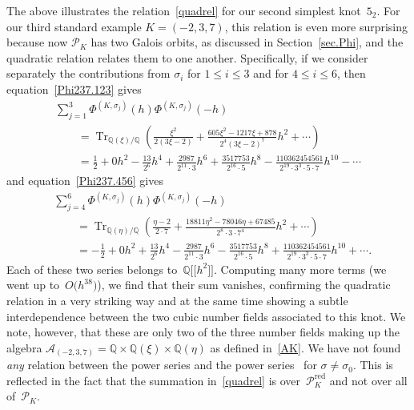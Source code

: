 \documentclass[pdftex]{sigma}
\numberwithin{equation}{section}
\def\BQ{\mathbb Q}
\def\calA{\mathcal A}
\def\calP{\mathcal P}
\def\calP{\mathcal P}
\def\a{\alpha}
\def\Q{\mathbb Q}
\def\m{ - }
\def\a{\alpha}
\def\s{\sigma}
\def\RED{^{\text{red}}}
\def\calPx{\mathcal{P}\RED} %
\begin{document}
The above illustrates the relation~\eqref{quadrel} for our second simplest knot~$5_2$.
For our third standard example $K=(-2,3,7)$, this relation is even more surprising
because now $\calP_K$ has two Galois orbits, as discussed in Section~\ref{sec.Phi},
and the quadratic relation relates them to one another. Specifically, if we
consider separately the contributions from $\s_i$ for $1\le i\le 3$ and
for $4\le i\le6$, then equation~\eqref{Phi237.123} gives
\begin{gather*}
 \sum_{j=1}^3 \Phi^{(K,\s_j)}(h) \Phi^{(K,\s_j)}(-h)\\
\qquad= \operatorname{Tr}_{\Q(\xi)/\Q}\left(\frac{\xi^2}{2 (3\xi-2)}
+ \frac{605\xi^2 - 1217 \xi +878}{2^4 (3\xi-2)^7} h^2 + \cdots\right) \\
 \qquad =\frac12+ 0 h^2 \m \frac{13}{2^6} h^4
+ \frac{2987}{2^{11}\cdot3} h^6 + \frac{3517753}{2^{16}\cdot5} h^8 \m
 \frac{110362454561}{2^{19}\cdot3^3\cdot5\cdot7} h^{10} - \cdots
\end{gather*}
and equation~\eqref{Phi237.456} gives
\begin{align*}
&\sum_{j=4}^6 \Phi^{(K,\s_j)}(h) \Phi^{(K,\s_j)}(-h)\\
&\qquad= \operatorname{Tr}_{\Q(\eta)/\Q}\left(\frac{\eta-2}{2\cdot7}
+ \frac{18811 \eta^2 -78046 \eta+ 67485}{2^8 \cdot 3 \cdot 7^4} h^2+ \cdots\right)\\
& \qquad =- \frac12 + 0 h^2 +\frac{13}{2^6} h^4
 \m \frac{2987}{2^{11}\cdot3} h^6 \m \frac{3517753}{2^{16}\cdot5} h^8 +
 \frac{110362454561}{2^{19}\cdot3^3\cdot5\cdot7} h^{10} + \cdots .
\end{align*}
Each of these two series belongs to~$\Q\big[\big[h^2\big]\big]$. Computing many more terms
\big(we went up to~$ O\big(h^{38}\big) $\big), we find that their sum vanishes,
confirming the quadratic relation in a very striking way and at the same time showing
a subtle interdependence between the two cubic number fields associated
to this knot. We note, however, that these are only two of the three
number fields making up the algebra
$\calA_{(-2,3,7)} = \Q\times\BQ(\xi)\times\BQ(\eta)$ as defined in~\eqref{AK}.
We have not found \emph{any} relation between the power series
\smash{$\Phi^{(K,\s_0)}_\a(h)$ or $\Phi^{(K,\s_0)}_\a(h)\Phi^{(K,\s_0)}_{-\a}(-h)$}
and the power series~\smash{$\Phi^{(K,\s)}_\a(h)$} for $\s\ne\s_0$. This is reflected
in the fact that the summation in~\eqref{quadrel} is over~$\calPx_K$ and not over all
of~$\calP_K$.
\end{document}

